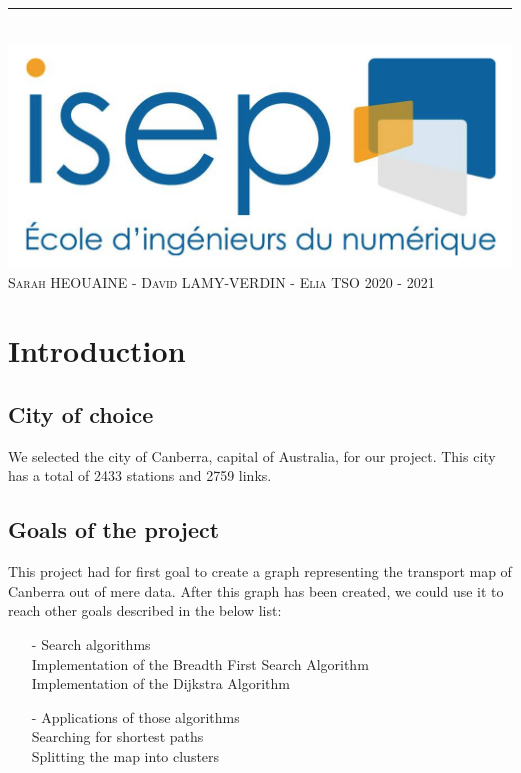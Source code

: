 \documentclass{article}
\begin{document}
\begin{titlepage}
\begin{center}
		\rule{16cm}{0.4pt} \\
		\vspace{5mm}
		\includegraphics[scale=0.20]{assets/logoISEP} \\
		\textsc{\large Sarah HEOUAINE - David LAMY-VERDIN - Elia TSO}
		\medbreak
		\textsc{\large 2020 - 2021}
	\end{center}
\end{titlepage}

\renewcommand{\contentsname}{Table of contents}
\tableofcontents
\cleardoublepage

\section{Introduction}

\subsection{City of choice}

	We selected the city of Canberra, capital of Australia, for our project. This city has a total of 2433 stations and 2759 links.
	
\subsection{Goals of the project}

	This project had for first goal to create a graph representing the transport map of Canberra out of mere data. After this graph has been created, we could use it to reach other goals described in the below list:
	
\begin{itemize}
\item[-] Search algorithms \\
Implementation of the Breadth First Search Algorithm \\
Implementation of the Dijkstra Algorithm
\medbreak
\item[-] Applications of those algorithms \\
Searching for shortest paths \\
Splitting the map into clusters
\end{itemize}
\end{document}
